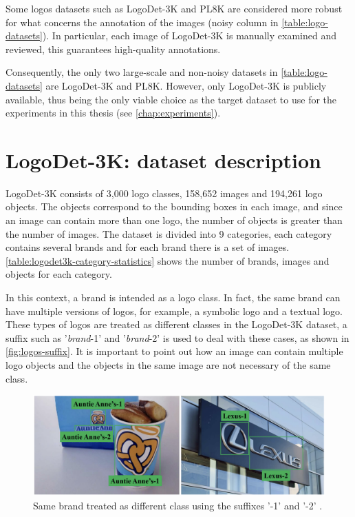 Some logos datasets such as LogoDet-3K and PL8K are considered more robust for what concerns the annotation of the images (noisy column in \autoref{table:logo-datasets}). In particular, each image of LogoDet-3K is manually examined and
reviewed, this guarantees high-quality annotations.

Consequently, the only two large-scale and non-noisy datasets in \autoref{table:logo-datasets} are LogoDet-3K and PL8K. However, only LogoDet-3K is publicly available, thus being the only viable choice as the target dataset to use for the experiments in this thesis (see \autoref{chap:experiments}).


\section{LogoDet-3K: dataset description}
\label{sec:logodet-desc}
LogoDet-3K consists of 3,000 logo classes,
158,652 images and 194,261 logo objects. The objects correspond to the bounding boxes in each image, and since an image can contain more than one logo, the number of objects is greater than the number of images. 
The dataset is divided into 9 categories, each category contains several brands and for each brand there is a set of images. \autoref{table:logodet3k-category-statistics} shows the number of brands, images and objects for each category.

In this context, a brand is intended as a logo class. In fact, the same brand can have multiple versions of logos, for example, a symbolic logo and a textual logo. These types of logos are treated as different classes in the LogoDet-3K dataset, a suffix such as '\textit{brand}-1' and '\textit{brand}-2' is used to deal with these cases, as shown in \autoref{fig:logos-suffix}.
It is important to point out how an image can contain multiple logo objects and the objects in the same image are not necessary of the same class.


\begin{figure}[H]
	\centering

    \begin{center}
        \includegraphics[width=\columnwidth]{images/logos-suffix.png}
    \end{center}
	\caption{Same brand treated as different class using the suffixes '-1' and '-2' \cite{wang2022logodet}.}%
	\label{fig:logos-suffix}%
\end{figure}

